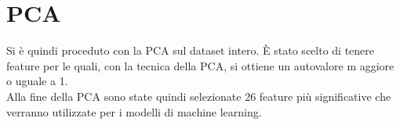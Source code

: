 \section{PCA}
Si è quindi proceduto con la PCA sul dataset intero. È stato scelto di tenere 
feature per le quali, con la tecnica della PCA, si ottiene un autovalore m
aggiore o uguale a 1.\\
Alla fine della PCA sono state quindi selezionate 26 feature più significative
che verranno utilizzate per i modelli di machine learning.